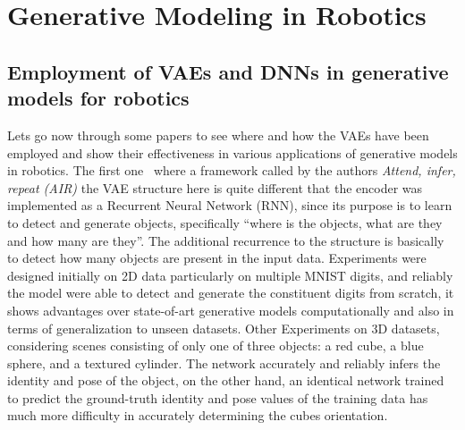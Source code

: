 

\pagestyle{fancy} 
\chapter{Generative Modeling in Robotics}
\label{cha:2}
\vspace{1cm}

\section{Employment of VAEs and DNNs in generative models for robotics}
\label{sec:VAE_generative}
Lets go now through some papers to see where and how the VAEs have been employed and show their effectiveness in various applications of generative models in robotics. The first one~\cite{eslami2016attend} where a framework called by the authors \textsl{Attend, infer, repeat (AIR)} the VAE structure here is quite different that the encoder was implemented as a Recurrent Neural Network (RNN), since its purpose is to learn to detect and generate objects, specifically “where is the objects, what are they and how many are they”. The additional recurrence to the structure is basically to detect how many objects are present in the input data. Experiments were designed initially on 2D data particularly on multiple MNIST digits, and reliably the model were able to detect and generate the constituent digits from scratch, it shows advantages over state-of-art generative models computationally and also in terms of generalization to unseen datasets. Other Experiments on 3D datasets, considering scenes consisting of only one of three objects: a red cube, a blue sphere, and a textured cylinder. The network accurately and reliably infers the identity and pose of the object, on the other hand, an identical network trained to predict the ground-truth identity and pose values of the training data has much more difficulty in accurately determining the cube\textquotesingle s orientation.\\


